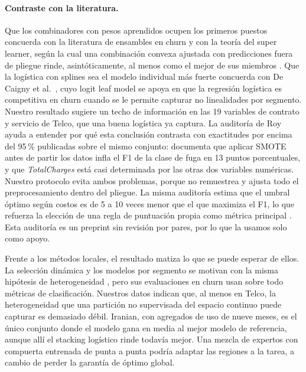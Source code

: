 \documentclass[11pt,a4paper]{article}
\begin{document}
\paragraph{Contraste con la literatura.} Que los combinadores con pesos aprendidos ocupen los primeros puestos concuerda con la literatura de ensambles en churn \cite{lemmens2006,debock2011} y con la teoría del super learner, según la cual una combinación convexa ajustada con predicciones fuera de pliegue rinde, asintóticamente, al menos como el mejor de sus miembros \cite{vanderlaan2007}. Que la logística con splines sea el modelo individual más fuerte concuerda con De Caigny et al.\ \cite{decaigny2018}, cuyo logit leaf model se apoya en que la regresión logística es competitiva en churn cuando se le permite capturar no linealidades por segmento. Nuestro resultado sugiere un techo de información en las 19 variables de contrato y servicio de Telco, que una buena logística ya captura. La auditoría de Roy \cite{roy2026} ayuda a entender por qué esta conclusión contrasta con exactitudes por encima del 95\,\% publicadas sobre el mismo conjunto: documenta que aplicar SMOTE antes de partir los datos infla el F1 de la clase de fuga en 13 puntos porcentuales, y que \emph{TotalCharges} está casi determinada por las otras dos variables numéricas. Nuestro protocolo evita ambos problemas, porque no remuestrea y ajusta todo el preprocesamiento dentro del pliegue. La misma auditoría estima que el umbral óptimo según costos es de 5 a 10 veces menor que el que maximiza el F1, lo que refuerza la elección de una regla de puntuación propia como métrica principal \cite{gneiting2007}. Esta auditoría es un preprint sin revisión por pares, por lo que la usamos solo como apoyo.

Frente a los métodos locales, el resultado matiza lo que se puede esperar de ellos. La selección dinámica y los modelos por segmento se motivan con la misma hipótesis de heterogeneidad \cite{ko2008,xiao2012,decaigny2018}, pero sus evaluaciones en churn usan sobre todo métricas de clasificación. Nuestros datos indican que, al menos en Telco, la heterogeneidad que una partición no supervisada del espacio continuo puede capturar es demasiado débil. Iranian, con agregados de uso de nueve meses, es el único conjunto donde el modelo gana en media al mejor modelo de referencia, aunque allí el stacking logístico rinde todavía mejor. Una mezcla de expertos con compuerta entrenada de punta a punta \cite{jordan1994} podría adaptar las regiones a la tarea, a cambio de perder la garantía de óptimo global.
\end{document}
